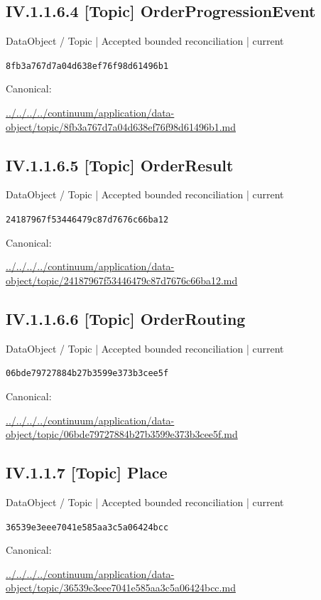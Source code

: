 \documentclass[10pt,a4paper]{article}
\begin{document}
\subsection*{IV.1.1.6.4 [Topic] OrderProgressionEvent}
{\small DataObject / Topic | Accepted bounded reconciliation | current}\par
\texttt{8fb3a767d7a04d638ef76f98d61496b1}\par
Canonical: \par
{\footnotesize\url{../../../../continuum/application/data-object/topic/8fb3a767d7a04d638ef76f98d61496b1.md}}\par
\subsection*{IV.1.1.6.5 [Topic] OrderResult}
{\small DataObject / Topic | Accepted bounded reconciliation | current}\par
\texttt{24187967f53446479c87d7676c66ba12}\par
Canonical: \par
{\footnotesize\url{../../../../continuum/application/data-object/topic/24187967f53446479c87d7676c66ba12.md}}\par
\subsection*{IV.1.1.6.6 [Topic] OrderRouting}
{\small DataObject / Topic | Accepted bounded reconciliation | current}\par
\texttt{06bde79727884b27b3599e373b3cee5f}\par
Canonical: \par
{\footnotesize\url{../../../../continuum/application/data-object/topic/06bde79727884b27b3599e373b3cee5f.md}}\par
\subsection*{IV.1.1.7 [Topic] Place}
{\small DataObject / Topic | Accepted bounded reconciliation | current}\par
\texttt{36539e3eee7041e585aa3c5a06424bcc}\par
Canonical: \par
{\footnotesize\url{../../../../continuum/application/data-object/topic/36539e3eee7041e585aa3c5a06424bcc.md}}\par
\end{document}

